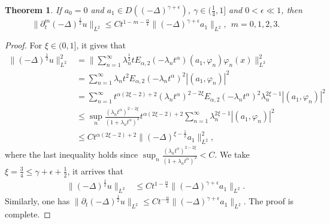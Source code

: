 \documentclass[11pt]{article}
\newtheorem{theorem}{Theorem}
\numberwithin{equation}{section}
\begin{document}
\begin{theorem}\label{thm-reg-delta-2}
If $a_0=0$ and $a_1\in D((-\Delta)^{\gamma+\epsilon})$, $\gamma\in(\frac14,1]$ and $0<\epsilon \ll 1$, then
\[
\|\partial_t^m(-\Delta)^{\frac12}u\|_{L^2}\le Ct^{1-m-\frac{\alpha}{4}}\|(-\Delta)^{\gamma+\epsilon}a_1\|_{L^2},~~m=0,1,2,3.
\]
\end{theorem}
\begin{proof} 
For $\xi\in(0,1]$, it gives that
\begin{align*}
\|(-\Delta)^{\frac12}u\|_{L^2}^2
& = \bigg\|\sum_{n=1}^{\infty}  \lambda_n^{\frac12}tE_{\alpha,2}(-\lambda_n t^\alpha)(a_1, \varphi_n) \varphi_n(x)\bigg\|_{L^2}^2\\
&=\sum_{n=1}^\infty\lambda_nt^2E_{\alpha,2}(-\lambda_n t^\alpha)^2|(a_1, \varphi_n)|^2\\
&=\sum_{n=1}^\infty t^{\alpha(2\xi-2)+2}(\lambda_nt^\alpha)^{2-2\xi}E_{\alpha,2}(-\lambda_n t^\alpha)^2\lambda_n^{2\xi-1}|(a_1, \varphi_n)|^2\\
&\le\sup_n\frac{(\lambda_nt^\alpha)^{2-2\xi}}{(1+\lambda_nt^\alpha)^2}t^{\alpha(2\xi-2)+2}\sum_{n=1}^\infty \lambda_n^{2\xi-1}|(a_1, \varphi_n)|^2\\
&\le Ct^{\alpha(2\xi-2)+2}\|(-\Delta)^{\xi-\frac12}a_1\|_{L^2}^2,
\end{align*}
where the last inequality holds since $\sup_n\frac{(\lambda_nt^\alpha)^{2-2\xi}}{(1+\lambda_nt^\alpha)^2}<C$.
We take $\xi=\frac34\leq\gamma+\epsilon+\frac12$, it arrives that
\begin{align*}
\|(-\Delta)^{\frac12}u\|_{L^2}
&\le Ct^{1-\frac{\alpha}{4}}\|(-\Delta)^{\gamma+\epsilon}a_1\|_{L^2}.
\end{align*}
Similarly, one has $\|\partial_t(-\Delta)^{\frac12}u\|_{L^2}\leq Ct^{-\frac{\alpha}{4}}\|(-\Delta)^{\gamma+\epsilon}a_1\|_{L^2}$. The proof is complete.
\end{proof}
\end{document}
